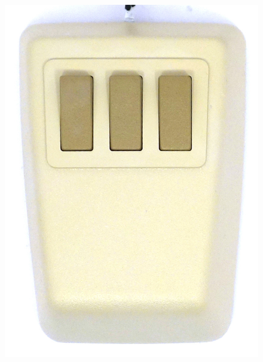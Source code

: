 \documentclass[11pt, a4paper]{article}
\begin{document}
\begin{figure}[h]
    \centering
    \includegraphics[scale=0.5]{1983_dec_vs10x_ea_mouse/top_60.jpg}

\end{figure}
\end{document}
